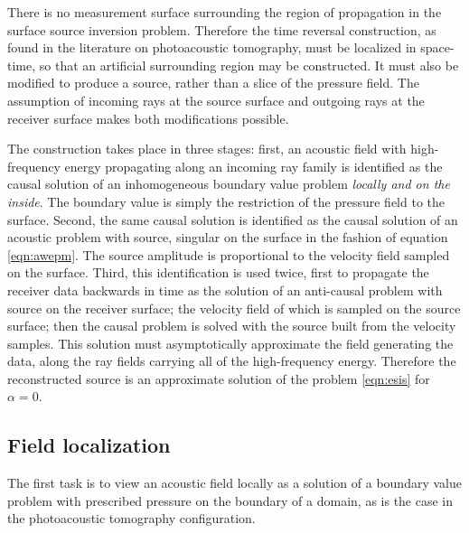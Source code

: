 \documentclass[12pt]{geophysics}
\begin{document}
There is no measurement surface surrounding the region of propagation
in the surface source inversion problem. Therefore the time reversal
construction, as found in the literature on photoacoustic tomography,
must be localized in space-time, so that an artificial surrounding
region may be constructed. It must also be modified to produce a
source, rather than a slice of the pressure field. The assumption of
incoming rays at the source surface and outgoing rays at the receiver
surface makes both modifications possible.

The construction takes place in three stages: first, an acoustic field
with high-frequency energy propagating along an incoming ray family is
identified as the causal solution of an inhomogeneous boundary value
problem {\em locally and on the inside}. The boundary value is simply
the restriction of the pressure field to the surface. Second, the same
causal solution is identified as the causal solution of an acoustic
problem with source, singular on the surface in the fashion of
equation \ref{eqn:awepm}. The source amplitude is proportional to the
velocity field sampled on the surface. Third, this identification is
used twice, first to propagate the receiver data backwards in time as
the solution of an anti-causal problem with source on the receiver
surface; the velocity field of which is sampled on the source surface;
then the causal problem is solved with the source built from the
velocity samples. This solution must asymptotically approximate the
field generating the data, along the ray fields carrying all of the
high-frequency energy. Therefore the reconstructed source is an
approximate solution of the problem \ref{eqn:esis} for $\alpha=0$.


\subsection{Field localization}
The first task is to view an acoustic field locally as a solution of a
boundary value problem with prescribed pressure on the boundary of a
domain, as is the case in the photoacoustic tomography configuration.
\end{document}
